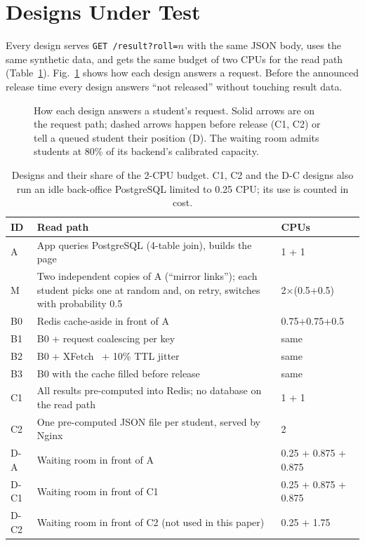 \section{Designs Under Test}
\label{sec:designs}

Every design serves \texttt{GET /result?roll=$n$} with the same JSON body, uses
the same synthetic data, and gets the same budget of two CPUs for the read
path (Table~\ref{tab:designs}). Fig.~\ref{fig:designs} shows how each design
answers a request. Before the announced release time every design answers
``not released'' without touching result data.

\begin{figure}[t]

\caption{How each design answers a student's request. Solid arrows are on the
request path; dashed arrows happen before release (C1, C2) or tell a queued
student their position (D). The waiting room admits students at 80\% of its
backend's calibrated capacity.}
\label{fig:designs}
\end{figure}

\begin{table}[t]
\caption{Designs and their share of the 2-CPU budget. C1, C2 and the D-C
designs also run an idle back-office PostgreSQL limited to 0.25 CPU; its use is
counted in cost.}
\label{tab:designs}
\centering
\footnotesize
\setlength{\tabcolsep}{3pt}
\begin{tabular}{@{}lp{4.6cm}l@{}}
\toprule
ID & Read path & CPUs \\
\midrule
A & App queries PostgreSQL (4-table join), builds the page & 1 + 1 \\
M & Two independent copies of A (``mirror links''); each student picks one at random and, on retry, switches with probability 0.5 & 2$\times$(0.5+0.5) \\
B0 & Redis cache-aside in front of A & 0.75+0.75+0.5 \\
B1 & B0 + request coalescing per key & same \\
B2 & B0 + XFetch~\cite{vattani2015xfetch} + 10\% TTL jitter & same \\
B3 & B0 with the cache filled before release & same \\
C1 & All results pre-computed into Redis; no database on the read path & 1 + 1 \\
C2 & One pre-computed JSON file per student, served by Nginx & 2 \\
D-A & Waiting room in front of A & 0.25 + 0.875 + 0.875 \\
D-C1 & Waiting room in front of C1 & 0.25 + 0.875 + 0.875 \\
D-C2 & Waiting room in front of C2 (not used in this paper) & 0.25 + 1.75 \\
\bottomrule
\end{tabular}
\end{table}

